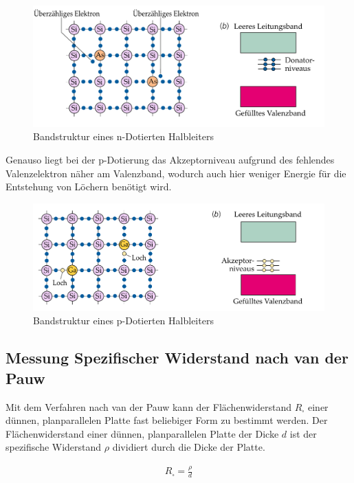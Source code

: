 \documentclass[a4paper]{scrartcl}
\numberwithin{equation}{subsection}
\begin{document}
\begin{figure}[H]
\includegraphics[width=12cm]{n-dotierter_Halbleiter}
\centering
\caption{Bandstruktur eines n-Dotierten Halbleiters \cite{tipler}}
\centering
\label{fig:bandstruktur-n-dotiert}
\end{figure}

Genauso liegt bei der p-Dotierung das Akzeptorniveau aufgrund des fehlendes Valenzelektron näher am Valenzband, wodurch auch hier weniger Energie für die Entstehung von Löchern benötigt wird. \cite{werk}

\begin{figure}[H]
\includegraphics[width=12cm]{p-dotierter_Halbleiter}
\centering
\caption{Bandstruktur eines p-Dotierten Halbleiters \cite{tipler}}
\centering
\label{fig:bandstruktur-p-dotiert}
\end{figure}


\subsection{Messung Spezifischer Widerstand nach van der Pauw}
Mit dem Verfahren nach van der Pauw kann der Flächenwiderstand $R_{\square}$ einer dünnen, planparallelen Platte fast beliebiger Form zu bestimmt werden. Der Flächenwiderstand einer dünnen, planparallelen Platte der Dicke $d$ ist der spezifische Widerstand $\rho$ dividiert durch die Dicke der Platte. 

\begin{align}
R_{\square} = \frac{\rho}{d}
\end{align}
\end{document}
